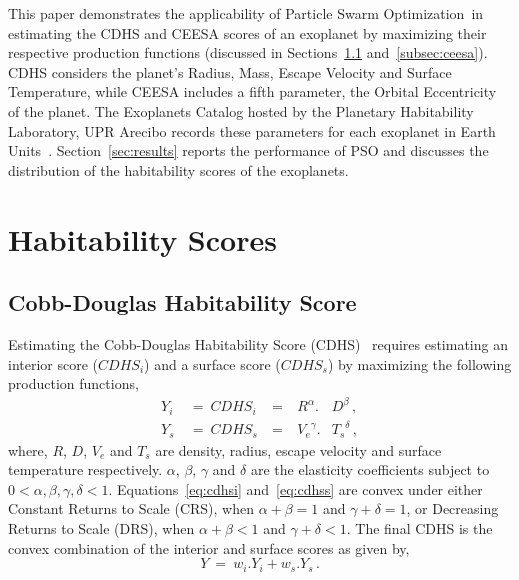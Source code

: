 \documentclass[10pt]{article}
\newcommand{\pso}{Particle Swarm Optimization}
\begin{document}
This paper demonstrates the applicability of \pso\ in estimating the CDHS and CEESA scores of an exoplanet by maximizing
their respective production functions (discussed in Sections~\ref{subsec:cdhs} and~\ref{subsec:ceesa}). CDHS considers
the planet's Radius, Mass, Escape Velocity and Surface Temperature, while CEESA includes a fifth parameter, the Orbital
Eccentricity of the planet. The Exoplanets Catalog hosted by the Planetary Habitability Laboratory, UPR Arecibo records
these parameters for each exoplanet in Earth Units~\cite{PHL}. Section~\ref{sec:results} reports the performance of PSO
and discusses the distribution of the habitability scores of the exoplanets.


\section{Habitability Scores}\label{sec:habscore}

\subsection{Cobb-Douglas Habitability Score}\label{subsec:cdhs}
Estimating the Cobb-Douglas Habitability Score (CDHS)~\cite{Bora} requires estimating an interior score \linebreak
($\mathit{CDHS}_i$) and a surface score ($\mathit{CDHS}_s$) by maximizing the following production functions,
\begin{subequations}
  \begin{alignat}{4}
    Y_i\ &=\ {CDHS}_i\ &=&\ R^\alpha.&D^\beta\,,\label{eq:cdhsi}\\
    Y_s\ &=\ {CDHS}_s\ &=&\ {V_e}^\gamma.&{T_s}^\delta\,,\label{eq:cdhss}
  \end{alignat}
\end{subequations}
where, $R$, $D$, $V_e$ and $T_s$ are density, radius, escape velocity and surface temperature respectively. $\alpha$,
$\beta$, $\gamma$ and $\delta$ are the elasticity coefficients subject to $0 < \alpha,\beta,\gamma,\delta < 1$.
Equations~\ref{eq:cdhsi} and~\ref{eq:cdhss} are convex under either Constant Returns to Scale (CRS), when
$\alpha+\beta=1$ and $\gamma+\delta=1$, or Decreasing Returns to Scale (DRS), when $\alpha+\beta<1$ and
$\gamma+\delta<1$. The final CDHS is the convex combination of the interior and surface scores as given by,
\begin{equation}
  Y\ =\ w_i.Y_i + w_s.Y_s\,.
\end{equation}
\end{document}
